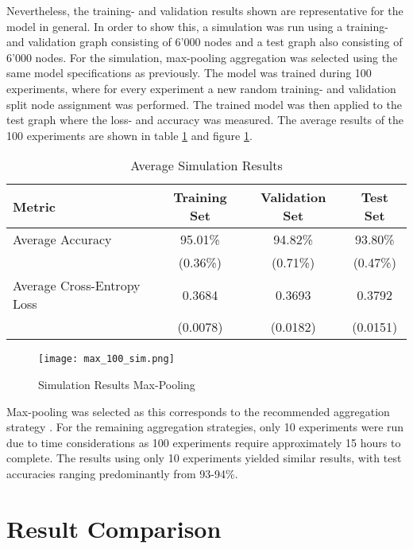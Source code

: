   \noindent Nevertheless, the training- and validation results shown are 
  representative for the model in general. In order to show this, a simulation 
  was run using a training- and validation graph consisting of 6'000 nodes and 
  a test graph also consisting of 6'000 nodes. For the simulation, max-pooling 
  aggregation was selected using the same model specifications as previously. 
  The model was trained during 100 experiments, where for every experiment a 
  new random training- and validation split node assignment was performed. The
  trained model was then applied to the test graph where the loss- and accuracy
  was measured. The average results of the 100 experiments are shown in table
  \ref{table:simulation_results} and figure \ref{fig:simulation_results}. 

  \begin{table}[h]
    \centering
      \begin{tabular}{|l||c|c|c|}
      \hline
      \textbf{Metric} & \textbf{Training Set} & \textbf{Validation Set} & 
      \textbf{Test Set}\\
      \hline\hline
      Average Accuracy & 95.01\% & 94.82\% & 93.80\% \\\hline 
                       & (0.36\%) & (0.71\%) & (0.47\%) \\\hline
      Average Cross-Entropy Loss & 0.3684 & 0.3693 & 0.3792 \\\hline
                                 & (0.0078) & (0.0182) & (0.0151) \\
      \hline
    \end{tabular}
    \caption{Average Simulation Results}
    \label{table:simulation_results}
  \end{table}

  \begin{figure}[h]
		\centering
		\texttt{[image: max\_100\_sim.png]}
		\caption{Simulation Results Max-Pooling}
        \label{fig:simulation_results}
  \end{figure}

  \noindent Max-pooling was selected as this corresponds to the recommended
  aggregation strategy \citep[p. 9]{hamilton2017inductive}. For the remaining
  aggregation strategies, only 10 experiments were run due to time
  considerations as 100 experiments require approximately 15 hours to complete.
  The results using only 10 experiments yielded similar results, with test
  accuracies ranging predominantly from 93-94\%. 

  \section{Result Comparison}
  \label{section:result_comp}

